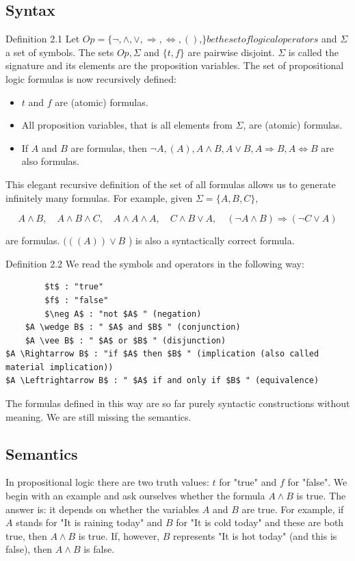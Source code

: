 \documentclass[10pt]{article}
\begin{document}
\subsection*{Syntax}
Definition 2.1 Let $O p=\{\neg, \wedge, \vee, \Rightarrow, \Leftrightarrow,()$,$\} be the set of logical operators$ and $\Sigma$ a set of symbols. The sets $O p, \Sigma$ and $\{t, f\}$ are pairwise disjoint. $\Sigma$ is called the signature and its elements are the proposition variables. The set of propositional logic formulas is now recursively defined:

\begin{itemize}
  \item $t$ and $f$ are (atomic) formulas.
  \item All proposition variables, that is all elements from $\Sigma$, are (atomic) formulas.
  \item If $A$ and $B$ are formulas, then $\neg A,(A), A \wedge B, A \vee B, A \Rightarrow B, A \Leftrightarrow B$ are also formulas.
\end{itemize}

This elegant recursive definition of the set of all formulas allows us to generate infinitely many formulas. For example, given $\Sigma=\{A, B, C\}$,

$$
A \wedge B, \quad A \wedge B \wedge C, \quad A \wedge A \wedge A, \quad C \wedge B \vee A, \quad(\neg A \wedge B) \Rightarrow(\neg C \vee A)
$$

are formulas. $(((A)) \vee B$ ) is also a syntactically correct formula.

Definition 2.2 We read the symbols and operators in the following way:

\begin{verbatim}
        $t$ : "true"
        $f$ : "false"
        $\neg A$ : "not $A$ " (negation)
    $A \wedge B$ : " $A$ and $B$ " (conjunction)
    $A \vee B$ : " $A$ or $B$ " (disjunction)
$A \Rightarrow B$ : "if $A$ then $B$ " (implication (also called material implication))
$A \Leftrightarrow B$ : " $A$ if and only if $B$ " (equivalence)
\end{verbatim}

The formulas defined in this way are so far purely syntactic constructions without meaning. We are still missing the semantics.

\subsection*{Semantics}
In propositional logic there are two truth values: $t$ for "true" and $f$ for "false". We begin with an example and ask ourselves whether the formula $A \wedge B$ is true. The answer is: it depends on whether the variables $A$ and $B$ are true. For example, if $A$ stands for "It is raining today" and $B$ for "It is cold today" and these are both true, then $A \wedge B$ is true. If, however, $B$ represents "It is hot today" (and this is false), then $A \wedge B$ is false.
\end{document}
